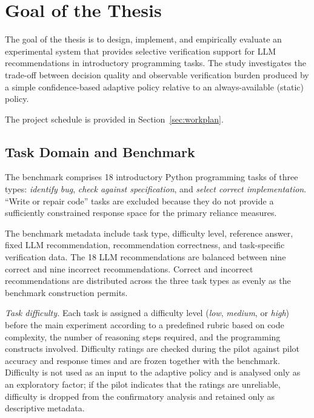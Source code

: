 \documentclass[oneside,final,14pt,a4paper]{extreport}
\begin{document}
\section{Goal of the Thesis}

The goal of the thesis is to design, implement, and empirically evaluate an
experimental system that provides selective verification support for LLM
recommendations in introductory programming tasks. The study investigates the
trade-off between decision quality and observable verification burden produced
by a simple confidence-based adaptive policy relative to an always-available
(static) policy.

The project schedule is provided in Section~\ref{sec:workplan}.

\subsection{Task Domain and Benchmark}
\label{subsec:answerspace}

The benchmark comprises 18 introductory Python programming tasks 
of three types: \emph{identify bug}, \emph{check against specification}, 
and \emph{select correct implementation}. ``Write or repair code'' 
tasks are excluded because they do not provide a sufficiently constrained 
response space for the primary reliance measures.

The benchmark metadata include task type, difficulty level, reference answer,
fixed LLM recommendation, recommendation correctness, and task-specific
verification data. The 18 LLM recommendations are balanced between nine
correct and nine incorrect recommendations. Correct and incorrect
recommendations are distributed across the three task types as evenly as the
benchmark construction permits.

\emph{Task difficulty.} Each task is assigned a difficulty level
(\emph{low}, \emph{medium}, or \emph{high}) before the main experiment
according to a predefined rubric based on code complexity, the number of
reasoning steps required, and the programming constructs involved. Difficulty
ratings are checked during the pilot against pilot accuracy and response
times and are frozen together with the benchmark. Difficulty is not used as
an input to the adaptive policy and is analysed only as an exploratory
factor; if the pilot indicates that the ratings are unreliable, difficulty is
dropped from the confirmatory analysis and retained only as descriptive
metadata.
\end{document}
